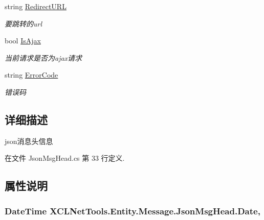 \begin{DoxyCompactItemize}
string \hyperlink{class_x_c_l_net_tools_1_1_entity_1_1_message_1_1_json_msg_head_aa3e8eb7bf16a7a3abea7e7797488685e}{Redirect\-U\-R\-L}
\begin{DoxyCompactList}\small\item\em 要跳转的url \end{DoxyCompactList}\item 
bool \hyperlink{class_x_c_l_net_tools_1_1_entity_1_1_message_1_1_json_msg_head_adedb9cb59037071c879572360cebc574}{Is\-Ajax}
\begin{DoxyCompactList}\small\item\em 当前请求是否为ajax请求 \end{DoxyCompactList}\item 
string \hyperlink{class_x_c_l_net_tools_1_1_entity_1_1_message_1_1_json_msg_head_a0f5effef61535ac1a2560f9c47eaea17}{Error\-Code}
\begin{DoxyCompactList}\small\item\em 错误码 \end{DoxyCompactList}\end{DoxyCompactItemize}


\subsection{详细描述}
json消息头信息 



在文件 Json\-Msg\-Head.\-cs 第 33 行定义.



\subsection{属性说明}
\hypertarget{class_x_c_l_net_tools_1_1_entity_1_1_message_1_1_json_msg_head_ae57b40b25eb4db28d428134d33358c90}{
\subsubsection[{Date}]{\setlength{\rightskip}{0pt plus 5cm}Date\-Time X\-C\-L\-Net\-Tools.\-Entity.\-Message.\-Json\-Msg\-Head.\-Date\hspace{0.3cm}{\ttfamily [get]}, {\ttfamily [set]}}}\label{class_x_c_l_net_tools_1_1_entity_1_1_message_1_1_json_msg_head_ae57b40b25eb4db28d428134d33358c90}


